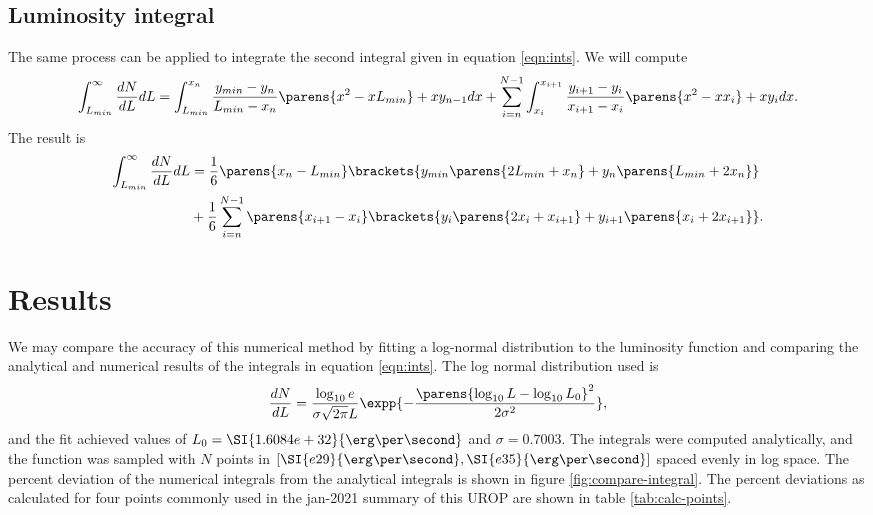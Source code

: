 \documentclass{C://Aliases//Dropbox-MIT//Latex_Templates//personal}
\begin{document}
\subsection{Luminosity integral}
The same process can be applied to integrate the second integral given in equation \ref{eqn:ints}. We will compute
\begin{equation*}
    \int_{L_{min}}^\infty \frac{dN}{dL}dL = \int_{L_{min}}^{x_{n}}\frac{y_{min} - y_n}{L_{min} - x_n}\parens{x^2 - xL_{min}} + xy_{n-1} dx + \sum_{i = n}^{N-1}\int_{x_i}^{x_{i+1}}\frac{y_{i+1} - y_i}{x_{i+1} - x_i}\parens{x^2 - xx_i} + xy_i dx.
\end{equation*}
The result is
\begin{align}\begin{split}
    \int_{L_{min}}^\infty \frac{dN}{dL}dL & = \frac{1}{6}\parens{x_n - L_{min}}\brackets{y_{min}\parens{2 L_{min} + x_n} + y_n\parens{L_{min} + 2x_n}}\\ 
    &+ \frac{1}{6}\sum_{i=n}^{N-1}\parens{x_{i+1} - x_{i}}\brackets{y_{i}\parens{2 x_{i} + x_{i+1}} + y_{i+1}\parens{x_{i} + 2x_{i+1}}}.
\end{split}\end{align}


\section{Results}
We may compare the accuracy of this numerical method by fitting a log-normal distribution to the luminosity function and comparing the analytical and numerical results of the integrals in equation \ref{eqn:ints}. The log normal distribution used is 
\begin{equation}
    \frac{dN}{dL} = \frac{\log_{10} e}{\sigma \sqrt{2\pi} L}\expp{-\frac{\parens{\log_{10} L - \log_{10} L_0}^2}{2\sigma^2}},
    \label{eqn:log-normal}
\end{equation}
and the fit achieved values of $L_0 = \SI{1.6084e+32}{\erg\per\second}$ and $\sigma=0.7003$. The integrals were computed analytically, and the function was sampled with $N$ points in $[\SI{e29}{\erg\per\second}, \SI{e35}{\erg\per\second}]$ spaced evenly in log space. The percent deviation of the numerical integrals from the analytical integrals is shown in figure \ref{fig:compare-integral}. The percent deviations as calculated for four points commonly used in the jan-2021 summary of this UROP are shown in table \ref{tab:calc-points}.
\end{document}

